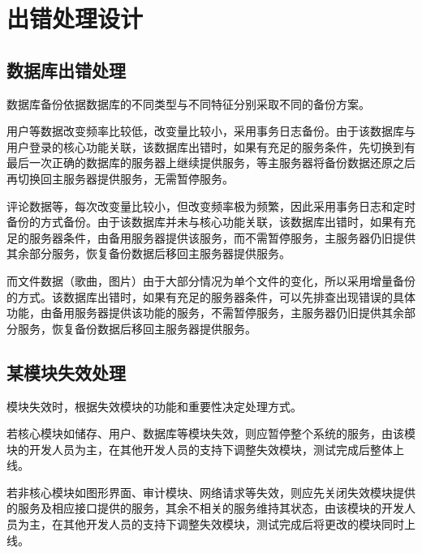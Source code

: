 \chapter{出错处理设计}
\section{数据库出错处理}

数据库备份依据数据库的不同类型与不同特征分别采取不同的备份方案。

用户等数据改变频率比较低，改变量比较小，采用事务日志备份。由于该数据库与用户登录的核心功能关联，该数据库出错时，如果有充足的服务条件，先切换到有最后一次正确的数据库的服务器上继续提供服务，等主服务器将备份数据还原之后再切换回主服务器提供服务，无需暂停服务。

评论数据等，每次改变量比较小，但改变频率极为频繁，因此采用事务日志和定时备份的方式备份。由于该数据库并未与核心功能关联，该数据库出错时，如果有充足的服务器条件，由备用服务器提供该服务，而不需暂停服务，主服务器仍旧提供其余部分服务，恢复备份数据后移回主服务器提供服务。

而文件数据（歌曲，图片）由于大部分情况为单个文件的变化，所以采用增量备份的方式。该数据库出错时，如果有充足的服务器条件，可以先排查出现错误的具体功能，由备用服务器提供该功能的服务，不需暂停服务，主服务器仍旧提供其余部分服务，恢复备份数据后移回主服务器提供服务。


\section{某模块失效处理}
模块失效时，根据失效模块的功能和重要性决定处理方式。

若核心模块如储存、用户、数据库等模块失效，则应暂停整个系统的服务，由该模块的开发人员为主，在其他开发人员的支持下调整失效模块，测试完成后整体上线。

若非核心模块如图形界面、审计模块、网络请求等失效，则应先关闭失效模块提供的服务及相应接口提供的服务，其余不相关的服务维持其状态，由该模块的开发人员为主，在其他开发人员的支持下调整失效模块，测试完成后将更改的模块同时上线。